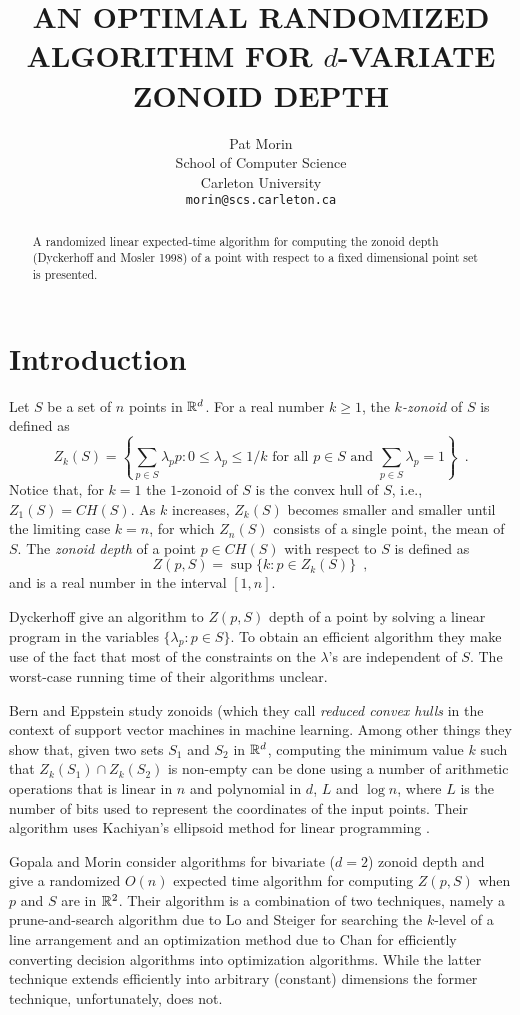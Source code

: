 \documentclass[lotsofwhite]{patmorin}
\title{\MakeUppercase{An Optimal Randomized Algorithm
	for} $d$\MakeUppercase{-Variate Zonoid Depth}}
\author{Pat Morin \\ 
	School of Computer Science \\
	Carleton University \\
	\texttt{morin@scs.carleton.ca}}
\date{}
\newcommand{\CH}{\mathit{CH}}
\begin{document}
\maketitle
\begin{abstract}
A randomized linear expected-time algorithm for computing the zonoid
depth (Dyckerhoff and Mosler 1998) of a point with respect to a fixed
dimensional point set is presented.
\end{abstract}

\section{Introduction}

Let $S$ be a set of $n$ points in $\mathbb{R}^d$.
For a real number $k\ge 1$, the \emph{$k$-zonoid} of $S$ is defined as 
\[
      Z_k(S) = \left\{\sum_{p\in S}\lambda_p p
	: \mbox{$0\le \lambda_p \le 1/k$ for all $p\in S$  
	   and $\sum_{p\in S}\lambda_p = 1$}  \right\} \enspace .
\] 
Notice that, for $k=1$ the $1$-zonoid of $S$ is the convex hull of
$S$,  i.e., $Z_1(S)=\CH(S)$.
As $k$ increases, $Z_k(S)$ becomes smaller and smaller until
the limiting case $k=n$, for which $Z_n(S)$ consists of a single point,
the mean of $S$.  The \emph{zonoid depth} of a point
$p\in\CH(S)$ with respect to $S$ is defined as
\[
     Z(p,S) = \sup\{k : p\in Z_k(S) \} \enspace ,
\]
and is a real number in the interval $[1,n]$.

Dyckerhoff \etal \cite{dXX} give an algorithm to $Z(p,S)$ depth of a
point by solving a linear program in the variables $\{\lambda_p:p\in
S\}$.  To obtain an efficient algorithm they make use of the fact that
most of the constraints on the $\lambda$'s are independent of $S$.
The worst-case running time of their algorithms unclear.

Bern and Eppstein study zonoids (which they call \emph{reduced convex
hulls} in the context of support vector machines in machine learning.
Among other things they show that, given two sets $S_1$ and $S_2$ in
$\mathbb{R}^d$, computing the minimum value $k$ such that $Z_k(S_1)\cap
Z_k(S_2)$ is non-empty can be done using a number of arithmetic
operations that is linear in $n$ and polynomial in $d$, $L$ and $\log
n$, where $L$ is the number of bits used to represent the coordinates
of the input points.  Their algorithm uses Kachiyan's ellipsoid method
for linear programming \cite{kXX}.

Gopala and Morin \cite{gm06} consider algorithms for bivariate ($d=2$)
zonoid depth and give a randomized $O(n)$ expected time algorithm for
computing $Z(p,S)$ when $p$ and $S$ are in $\mathbb{R}^2$.  Their algorithm is
a combination of two techniques, namely a prune-and-search algorithm
due to Lo and Steiger \cite{lsXX} for searching the $k$-level of a
line arrangement and an optimization method due to Chan \cite{X} for
efficiently converting decision algorithms into optimization
algorithms.   While the latter technique extends efficiently into
arbitrary (constant) dimensions \cite{c04} the former technique,
unfortunately, does not.
\end{document}
